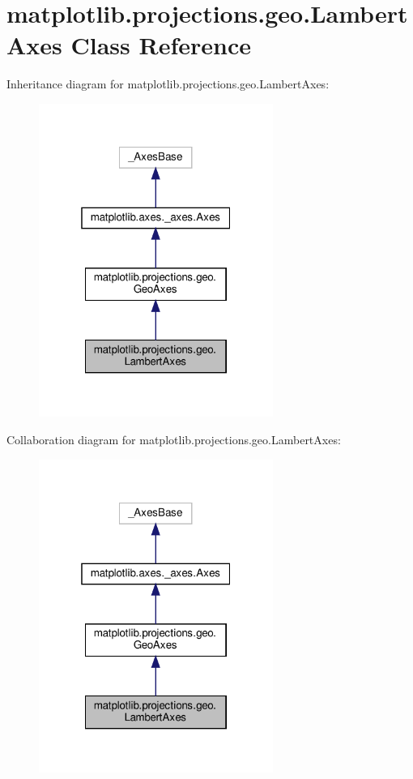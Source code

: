\hypertarget{classmatplotlib_1_1projections_1_1geo_1_1LambertAxes}{}\section{matplotlib.\+projections.\+geo.\+Lambert\+Axes Class Reference}
\label{classmatplotlib_1_1projections_1_1geo_1_1LambertAxes}


Inheritance diagram for matplotlib.\+projections.\+geo.\+Lambert\+Axes\+:
\nopagebreak
\begin{figure}[H]
\begin{center}
\leavevmode
\includegraphics[width=217pt]{classmatplotlib_1_1projections_1_1geo_1_1LambertAxes__inherit__graph}
\end{center}
\end{figure}


Collaboration diagram for matplotlib.\+projections.\+geo.\+Lambert\+Axes\+:
\nopagebreak
\begin{figure}[H]
\begin{center}
\leavevmode
\includegraphics[width=217pt]{classmatplotlib_1_1projections_1_1geo_1_1LambertAxes__coll__graph}
\end{center}
\end{figure}
